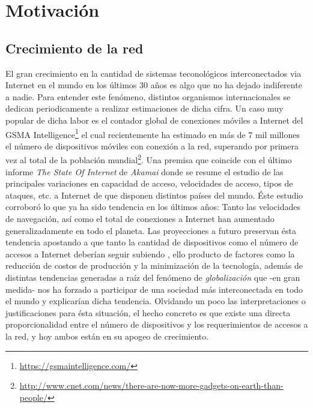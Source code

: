 \chapter{Motivación}
\section{Crecimiento de la red}
El gran crecimiento en la cantidad de sistemas teconológicos interconectados via Internet en el mundo en los últimos 30 años es algo que no ha dejado indiferente a nadie. Para entender este fenómeno, distintos organismos internacionales se dedican periodicamente a realizar estimaciones de dicha cifra. Un caso muy popular de dicha labor es el contador global de conexiones móviles a Internet del GSMA Intelligence\footnote{\url{https://gsmaintelligence.com/}} el cual recientemente ha estimado en más de 7 mil millones el número de dispositivos móviles con conexión a la red, superando por primera vez al total de la población mundial\footnote{\url{http://www.cnet.com/news/there-are-now-more-gadgets-on-earth-than-people/}}. Una premisa que coincide con el último informe \emph{The State Of Internet} de \emph{Akamai} \cite{report:akamai} donde se resume el estudio de las principales variaciones en capacidad de acceso, velocidades de acceso, tipos de ataques, etc. a Internet de que disponen distintos países del mundo. Éste estudio corroboró lo que ya ha sido tendencia en los últimos años: Tanto las velocidades de navegación, así como el total de conexiones a Internet han aumentado generalizadamente en todo el planeta. Las proyecciones a futuro preservan ésta tendencia apostando a que tanto la cantidad de dispositivos como el número de accesos a Internet deberían seguir subiendo \cite{nota:2020}, ello producto de factores como la reducción de costos de producción y la minimización de la tecnología, además de distintas tendencias generadas a raíz del fenómeno de \emph{globalización} que -en gran medida- nos ha forzado a participar de una sociedad más interconectada en todo el mundo y explicarían dicha tendencia. Olvidando un poco las interpretaciones o justificaciones para ésta situación, el hecho concreto es que existe una directa proporcionalidad entre el número de dispositivos y los requerimientos de accesos a la red, y hoy ambos están en su apogeo de crecimiento.

